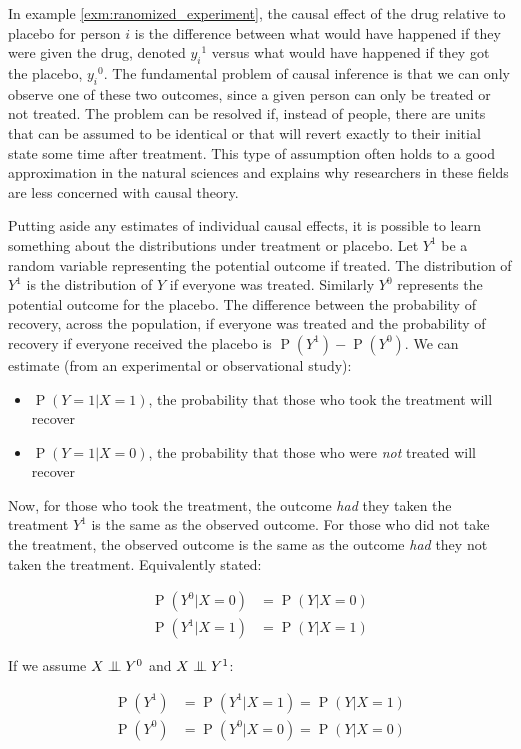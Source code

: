 \documentclass[11pt,a4paper,twoside]{report}
\newcommand{\eq}[1]{\begin{align*}#1\end{align*}}
\renewcommand{\P}[1]{\operatorname{P}\left(#1\right)}
\newcommand{\cf}[2]{{#1}^{#2}}
\theoremstyle{plain}
\theoremstyle{definition}
\newcommand{\ci}{\mathrel{\perp\mspace{-10mu}\perp}}
\begin{document}
In example \ref{exm:ranomized_experiment}, the causal effect of the drug relative to placebo for person $i$ is the difference between what would have happened if they were given the drug, denoted $\cf{y_{i}}{1}$ versus what would have happened if they got the placebo, $\cf{y_{i}}{0}$. The fundamental problem of causal inference is that we can only observe one of these two outcomes, since a given person can only be treated or not treated. The problem can be resolved if, instead of people, there are units that can be assumed to be identical or that will revert exactly to their initial state some time after treatment. This type of assumption often holds to a good approximation in the natural sciences and explains why researchers in these fields are less concerned with causal theory. 

Putting aside any estimates of individual causal effects, it is possible to learn something about the distributions under treatment or placebo. Let $\cf{Y}{1}$ be a random variable representing the potential outcome if treated. The distribution of $\cf{Y}{1}$ is the distribution of $Y$ if everyone was treated. Similarly $Y^{0}$ represents the potential outcome for the placebo. The difference between the probability of recovery, across the population, if everyone was treated and the probability of recovery if everyone received the placebo is $\P{\cf{Y}{1}}-\P{\cf{Y}{0}}$. We can estimate (from an experimental or observational study):
\begin{itemize}
\item $\P{Y=1|X=1}$, the probability that those who took the treatment will recover
\item $\P{Y=1|X=0}$, the probability that those who were \emph{not} treated will recover
\end{itemize}

Now, for those who took the treatment, the outcome \emph{had} they taken the treatment $\cf{Y}{1}$ is the same as the observed outcome. For those who did not take the treatment, the observed outcome is the same as the outcome \emph{had} they not taken the treatment. Equivalently stated:

\eq{
\P{Y^{0}|X=0}&= \P{Y|X=0}\\
\P{Y^{1}|X=1}&=\P{Y|X=1}
}

If we assume $X \ci Y^{0}$ and $X \ci Y^{1}$:

\eq{
\P{Y^{1}} &= \P{Y^{1}|X=1} = \P{Y|X=1} \\
\P{Y^{0}} &= \P{Y^{0}|X=0} = \P{Y|X=0}
}
\end{document}
